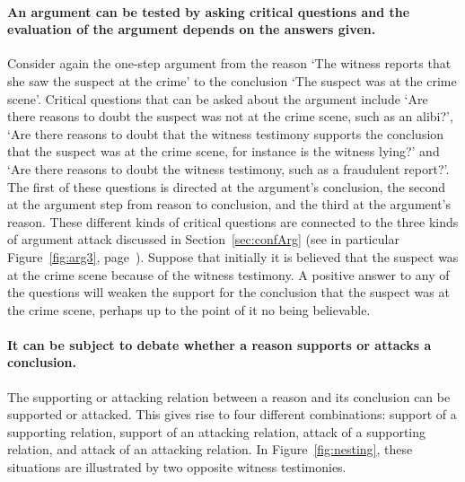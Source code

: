 \documentclass[10pt]{article}
\begin{document}
\paragraph{An argument can be tested by asking critical questions and the evaluation of the argument depends on the answers given.} 
Consider again the one-step argument from the reason `The witness reports that she saw the suspect at the crime' to the conclusion `The suspect was at the crime scene'. 
Critical questions that can be asked about the argument include `Are there reasons to doubt the suspect was not at the crime scene, such as an alibi?', `Are there reasons to doubt that the witness testimony supports the conclusion that the suspect was at the crime scene, for instance is the witness lying?' and `Are there reasons to doubt the witness testimony, such as a fraudulent report?'. The first of these questions is directed at the argument's conclusion, the second at the argument step from reason to conclusion, and the third at the argument's reason. These different kinds of critical questions are connected to the three kinds of argument attack discussed in Section~\ref{sec:confArg} (see in particular Figure~\ref{fig:arg3}, page~\pageref{fig:arg3}). 
Suppose that initially it is believed that the suspect was at the crime scene because of the witness testimony. A positive answer to any of the questions will weaken the support for the conclusion that the suspect was at the crime scene, perhaps up to the point of it no being believable.

\paragraph{It can be subject to debate whether a reason supports or attacks a conclusion.} The supporting or attacking relation between a reason and its conclusion can be supported or attacked. This gives rise to four different combinations: support of a supporting relation, support of an attacking relation, attack of a supporting relation, and attack of an attacking relation. In Figure~\ref{fig:nesting}, these situations are illustrated by two opposite witness testimonies. 
\end{document}
